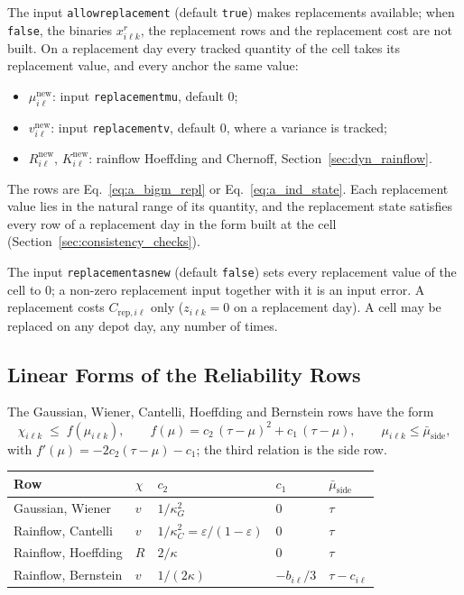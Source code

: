 \documentclass[11pt,a4paper]{article}
\theoremstyle{plain}
\theoremstyle{definition}
\newcommand{\new}{\mathrm{new}}
\renewcommand{\_}{\textunderscore\allowbreak{}}
\begin{document}
The input \texttt{allow\_replacement} (default \texttt{true}) makes replacements
available; when \texttt{false}, the binaries $x^r_{i\ell k}$, the replacement rows and
the replacement cost are not built. On a replacement day every tracked quantity of
the cell takes its replacement value, and every anchor the same value:
\begin{itemize}[nosep,leftmargin=1.5em]
  \item $\mu^{\new}_{i\ell}$: input \texttt{replacement\_mu}, default $0$;
  \item $v^{\new}_{i\ell}$: input \texttt{replacement\_v}, default $0$, where a
        variance is tracked;
  \item $R^{\new}_{i\ell}$, $K^{\new}_{i\ell}$: rainflow Hoeffding and Chernoff,
        Section~\ref{sec:dyn_rainflow}.
\end{itemize}
The rows are Eq.~\eqref{eq:a_bigm_repl} or Eq.~\eqref{eq:a_ind_state}. Each
replacement value lies in the natural range of its quantity, and the replacement
state satisfies every row of a replacement day in the form built at the cell
(Section~\ref{sec:consistency_checks}).

The input \texttt{replacement\_as\_new} (default \texttt{false}) sets every replacement
value of the cell to $0$; a non-zero replacement input together with it is an input
error. A replacement costs $C_{\mathrm{rep},i\ell}$ only ($z_{i\ell k} = 0$ on a
replacement day). A cell may be replaced on any depot day, any number of times.

\subsection{Linear Forms of the Reliability Rows}
\label{sec:linear_forms}

The Gaussian, Wiener, Cantelli, Hoeffding and Bernstein rows have the form
\begin{equation}
  \chi_{i\ell k} \;\leq\; f(\mu_{i\ell k}),
  \qquad f(\mu) = c_2\,(\tau - \mu)^2 + c_1\,(\tau - \mu),
  \qquad \mu_{i\ell k} \leq \bar\mu_{\mathrm{side}},
  \label{eq:a_quad}
\end{equation}
with $f'(\mu) = -2c_2(\tau - \mu) - c_1$; the third relation is the side row.

\begingroup\small
\begin{longtable}{@{}lllll@{}}
\toprule
Row & $\chi$ & $c_2$ & $c_1$ & $\bar\mu_{\mathrm{side}}$ \\
\midrule
Gaussian, Wiener & $v$ & $1/\kappa_G^2$ & $0$ & $\tau$ \\
Rainflow, Cantelli & $v$ & $1/\kappa_C^2 = \varepsilon/(1-\varepsilon)$ & $0$ & $\tau$ \\
Rainflow, Hoeffding & $R$ & $2/\kappa$ & $0$ & $\tau$ \\
Rainflow, Bernstein & $v$ & $1/(2\kappa)$ & $-b_{i\ell}/3$ & $\tau - c_{i\ell}$ \\
\bottomrule
\end{longtable}
\endgroup
\end{document}

